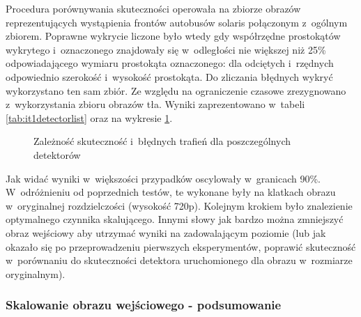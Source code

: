 Procedura porównywania skuteczności operowała na zbiorze obrazów
reprezentujących wystąpienia frontów autobusów solaris połączonym
z~ogólnym zbiorem. Poprawne
wykrycie liczone było wtedy gdy współrzędne prostokątów wykrytego
i~oznaczonego znajdowały się w~odległości nie większej niż 25\% odpowiadającego
wymiaru prostokąta oznaczonego: dla odciętych i~rzędnych odpowiednio szerokość
i~wysokość prostokąta. Do zliczania błędnych wykryć wykorzystano ten sam zbiór.
Ze względu na ograniczenie czasowe zrezygnowano z~wykorzystania zbioru
obrazów tła. Wyniki zaprezentowano w~tabeli \ref{tab:it1detectorlist} oraz
na wykresie \ref{fig:it1detectorlist}.

\begin{figure}
\begin{center}
\end{center}
\caption{Zależność skuteczność i~błędnych trafień dla poszczególnych detektorów}
\label{fig:it1detectorlist}
\end{figure}

Jak widać wyniki w~większości przypadków oscylowały w~granicach 90\%.
W~odróżnieniu od poprzednich testów, te wykonane były na klatkach obrazu
w~oryginalnej rozdzielczości (wysokość 720p). 
Kolejnym krokiem było znalezienie
optymalnego czynnika skalującego. Innymi słowy jak bardzo można zmniejszyć
obraz wejściowy aby utrzymać wyniki na zadowalającym poziomie
(lub jak okazało się po przeprowadzeniu pierwszych eksperymentów,
poprawić skuteczność w~porównaniu do skuteczności detektora uruchomionego
dla obrazu w~rozmiarze oryginalnym).

\subsubsection{Skalowanie obrazu wejściowego - podsumowanie}

